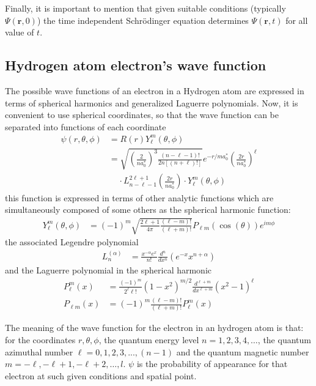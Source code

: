 \documentclass{aa}%
\begin{document}
Finally, it is important to mention that given suitable conditions (typically $\Psi(\mathbf{r},0)$) the time independent Schrödinger equation determines $\Psi(\mathbf{r},t)$ for all value of $t$.\cite{grif}

\subsection{Hydrogen atom electron's wave function}
The possible wave functions of an electron in a Hydrogen atom are expressed in terms of spherical harmonics and generalized Laguerre polynomials. Now, it is convenient to use spherical coordinates, so that the wave function can be separated into functions of each coordinate \cite{hydro}
\begin{align}
	\psi(r,\theta,\phi) &= R(r)Y_{\ell}^m(\theta,\phi)\\
	&= \sqrt{\left( \frac{2}{na_0^*} \right)^3 \frac{(n-\ell-1)!}{2n[(n+\ell)!]}} e^{-r/ma_0^*} \left( \frac{2r}{na_0^*} \right)^\ell\\
	&~~~~~\cdot L_{n-\ell-1}^{2\ell+1}\left( \frac{2r}{na_0^*} \right) \cdot Y_\ell^m(\theta,\phi) 
\end{align}
this function is expressed in terms of other analytic functions which are simultaneously composed of some others as the spherical harmonic function:
\begin{align}
	Y_\ell^m(\theta,\phi) &= (-1)^m\sqrt{\frac{2\ell+1}{4\pi}\frac{(\ell-m)!}{(\ell+m)!}} P_{\ell m}(\cos(\theta))e^{im\phi}
\end{align}
the associated Legendre polynomial
\begin{align}
	L_n^{(\alpha)} &= \frac{x^{-\alpha}e^x}{n!} \frac{d^n}{dx^n}\left( e^{-x} x^{n+\alpha} \right)
\end{align}
and the Laguerre polynomial in the spherical harmonic
\begin{align}
	P_\ell^m(x) &= \frac{(-1)^m}{2^\ell \ell!}(1-x^2)^{m/2}\frac{d^{\ell+m}}{dx^{\ell+m}}(x^2-1)^\ell\\
	P_{\ell m}(x) &= (-1)^m \frac{(\ell-m)!}{(\ell+m)!}P_\ell^m(x)
\end{align}

The meaning of the wave function for the electron in an hydrogen atom is that: for the coordinates $r,\theta,\phi$, the quantum energy level $n = 1,2,3,4,\dots$, the quantum azimuthal number $\ell=0,1,2,3,...,(n-1)$ and the quantum magnetic number $m=-\ell,-\ell+1,-\ell+2,\dots,l$. $\psi$ is the probability of appearance for that electron at such given conditions and spatial point.
\end{document}
